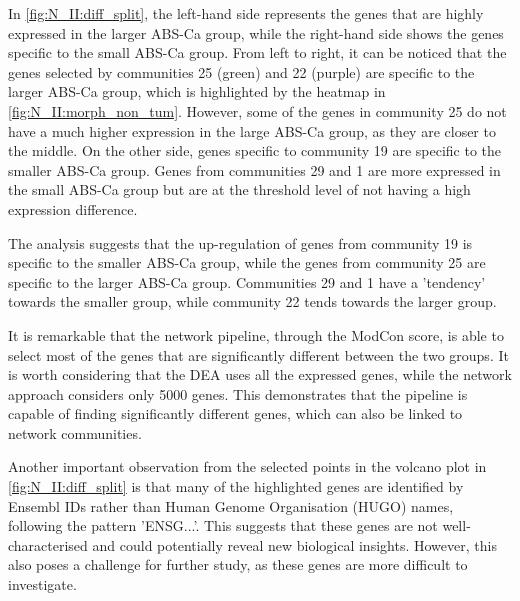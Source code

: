 
In \cref{fig:N_II:diff_split}, the left-hand side represents the genes that are highly expressed in the larger ABS-Ca group, while the right-hand side shows the genes specific to the small ABS-Ca group. From left to right, it can be noticed that the genes selected by communities 25 (green) and 22 (purple) are specific to the larger ABS-Ca group, which is highlighted by the heatmap in \cref{fig:N_II:morph_non_tum}. However, some of the genes in community 25 do not have a much higher expression in the large ABS-Ca group, as they are closer to the middle. On the other side, genes specific to community 19 are specific to the smaller ABS-Ca group. Genes from communities 29 and 1 are more expressed in the small ABS-Ca group but are at the threshold level of not having a high expression difference.

The analysis suggests that the up-regulation of genes from community 19 is specific to the smaller ABS-Ca group, while the genes from community 25 are specific to the larger ABS-Ca group. Communities 29 and 1 have a 'tendency' towards the smaller group, while community 22 tends towards the larger group.

It is remarkable that the network pipeline, through the ModCon score, is able to select most of the genes that are significantly different between the two groups. It is worth considering that the DEA uses all the expressed genes, while the network approach considers only 5000 genes. This demonstrates that the pipeline is capable of finding significantly different genes, which can also be linked to network communities.

Another important observation from the selected points in the volcano plot in \cref{fig:N_II:diff_split} is that many of the highlighted genes are identified by Ensembl IDs rather than Human Genome Organisation (HUGO) names, following the pattern 'ENSG...'. This suggests that these genes are not well-characterised and could potentially reveal new biological insights. However, this also poses a challenge for further study, as these genes are more difficult to investigate.


